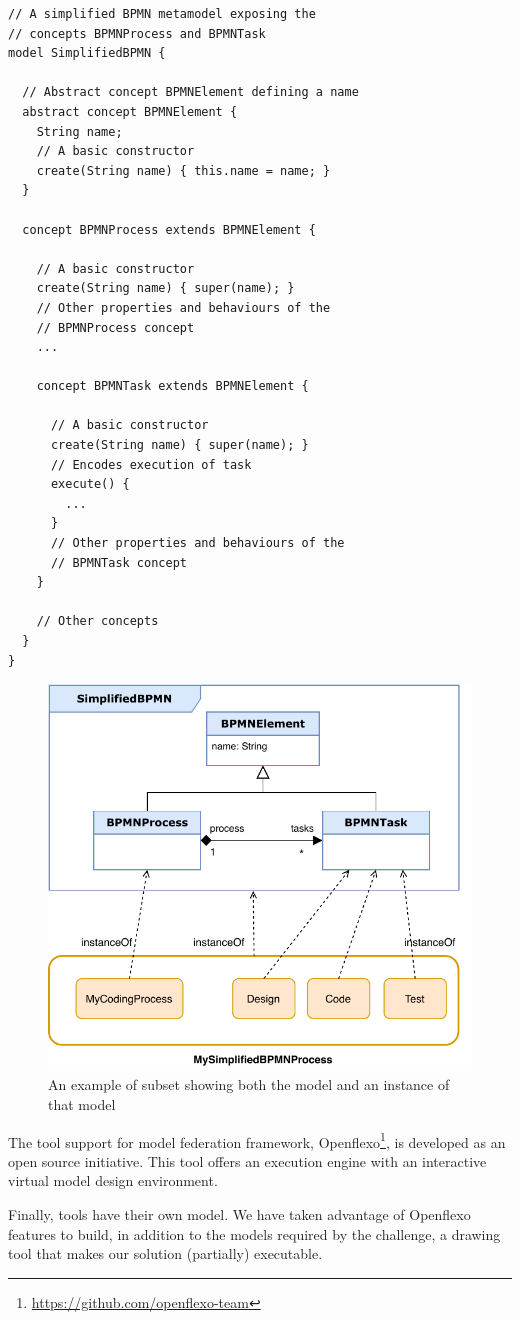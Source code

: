 \begin{lstlisting}
// A simplified BPMN metamodel exposing the
// concepts BPMNProcess and BPMNTask
model SimplifiedBPMN {

  // Abstract concept BPMNElement defining a name
  abstract concept BPMNElement {
    String name;
    // A basic constructor
    create(String name) { this.name = name; }
  }

  concept BPMNProcess extends BPMNElement {

    // A basic constructor
    create(String name) { super(name); }
    // Other properties and behaviours of the
    // BPMNProcess concept
    ...

    concept BPMNTask extends BPMNElement {

      // A basic constructor
      create(String name) { super(name); }
      // Encodes execution of task
      execute() {
        ...
      }
      // Other properties and behaviours of the
      // BPMNTask concept
    }

    // Other concepts
  }
}
\end{lstlisting}

\begin{figure}[t]
    \centering
    \includegraphics[width=\columnwidth]{Figures/BPMNSubsetExample-1.5.pdf}
    \caption{An example of \BPMN subset showing both the model and an instance of that model}
    \label{fig:BPMNSubsetExample}
\end{figure}


The tool support for model federation framework,
Openflexo\footnote{\url{https://github.com/openflexo-team}}, is
developed as an open source initiative. This tool offers an \FML
execution engine with an interactive virtual model design environment.

Finally, tools have their own model. We have taken advantage of Openflexo
features to build, in addition to the models  required by the challenge, a
drawing tool that makes our solution (partially) executable.
